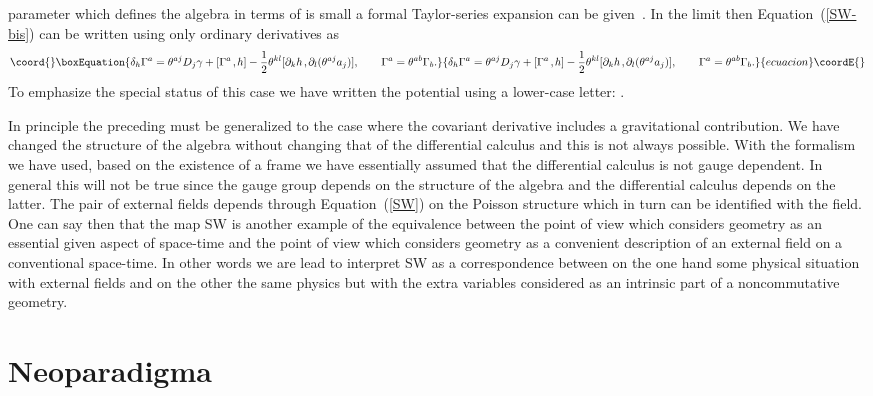 \documentclass[a4paper,12pt]{article}
\def\h#1{\hat #1}
\def\p{\partial}
\def\c#1{{\cal #1}}
\def\kbar{{\mathchar'26\mkern-9muk}}
\def\k{\kern-.1em\mathbin{,}\kern-.1em}
\providecommand{\initiate}{\setcounter{equation}{0}}
\begin{document}
parameter \myHighlight{$\kbar$}\coordHE{} which defines the algebra \myHighlight{$\h{\c}{A}$}\coordHE{} in terms of
\myHighlight{$\c{A}$}\coordHE{} is small a formal Taylor-series expansion can be
given~\cite{SeiWit99}.  In the limit then \coordHE{}
Equation~(\ref{SW-bis}) can be written using only ordinary derivatives
as
\begin{equation}\coord{}\boxEquation{
\delta_h\Gamma^a = \theta^{aj} D_j \gamma + [\Gamma^a \k h] - 
\frac 12 \theta^{kl} [\p_k h \k \p_l (\theta^{aj} a_j)], 
\qquad \Gamma^a = \theta^{ab}\Gamma_b.                          \label{Wess}
}{
\delta_h\Gamma^a = \theta^{aj} D_j \gamma + [\Gamma^a \k h] - 
\frac 12 \theta^{kl} [\p_k h \k \p_l (\theta^{aj} a_j)], 
\qquad \Gamma^a = \theta^{ab}\Gamma_b.                          }{ecuacion}\coordE{}\end{equation}
To emphasize the special status of this case we have written the
potential using a lower-case letter: \coordHE{}. 

In principle the preceding must be generalized to the case where the
covariant derivative includes a gravitational contribution. We have
changed the structure of the algebra without changing that of the
differential calculus and this is not always possible.  With the
formalism we have used, based on the existence of a frame we have
essentially assumed that the differential calculus is not gauge
dependent. In general this will not be true since the gauge group
depends on the structure of the algebra and the differential calculus
depends on the latter.  The pair \myHighlight{$(\gamma,\Gamma)$}\coordHE{} of external fields
depends through Equation~(\ref{SW}) on the Poisson structure \myHighlight{$\theta$}\coordHE{}
which in turn can be identified with the \coordHE{} field.  One can say then
that the map SW is another example of the equivalence between the
point of view which considers geometry as an essential given aspect of
space-time and the point of view which considers geometry as a
convenient description of an external field on a conventional
space-time. In other words we are lead to interpret SW as a
correspondence between on the one hand some physical situation with
external fields and on the other the same physics but with the extra
variables considered as an intrinsic part of a noncommutative
geometry. 


\initiate
\section{Neoparadigma} 
\end{document}
